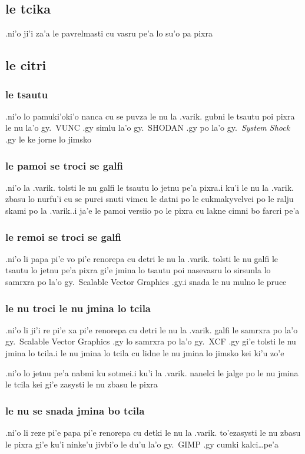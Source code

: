 \documentclass{report}
\begin{document}
\subsection{le tcika}
.ni'o ji'i za'a le pavrelmasti cu vasru pe'a lo su'o pa pixra
\subsection{le citri}
\subsubsection{le tsautu}
.ni'o lo pamuki'oki'o nanca cu se puvza le nu la .varik. gubni le tsautu poi pixra le nu la'o gy.\ VUNC .gy simlu la'o gy.\ SHODAN .gy po la'o gy.\ \textit{System Shock} .gy le ke jorne lo jimsko
\subsubsection{le pamoi se troci se galfi}
.ni'o la .varik. tolsti le nu galfi le tsautu lo jetnu pe'a pixra\@  .i ku'i le nu la .varik. zbasu lo nurfu'i cu se purci snuti vimcu le datni po le cukmakyvelvei po le ralju skami po la .varik.\@  .i ja'e le pamoi versiio po le pixra cu lakne cimni bo farcri pe'a
\subsubsection{le remoi se troci se galfi}
.ni'o li papa pi'e vo pi'e renorepa cu detri le nu la .varik. tolsti le nu galfi le tsautu lo jetnu pe'a pixra gi'e jmina lo tsautu poi nasevasru lo sirsunla lo samrxra po la'o gy.\ Scalable Vector Graphics .gy\@  .i snada le nu mulno le pruce
\subsubsection{le nu troci le nu jmina lo tcila}
.ni'o li ji'i re pi'e xa pi'e renorepa cu detri le nu la .varik. galfi le samrxra po la'o gy.\ Scalable Vector Graphics .gy lo samrxra po la'o gy.\ XCF .gy gi'e tolsti le nu jmina lo tcila\@  .i le nu jmina lo tcila cu lidne le nu jmina lo jimsko kei ki'u zo'e

.ni'o lo jetnu pe'a nabmi ku sotmei\@  .i ku'i la .varik. nanelci le jalge po le nu jmina le tcila kei gi'e zasysti le nu zbasu le pixra
\subsubsection{le nu se snada jmina bo tcila}
.ni'o li reze pi'e papa pi'e renorepa cu detki le nu la .varik. to'ezasysti le nu zbasu le pixra gi'e ku'i ninke'u jivbi'o le du'u la'o gy.\ GIMP .gy cumki kalci\ldots pe'a
\end{document}
